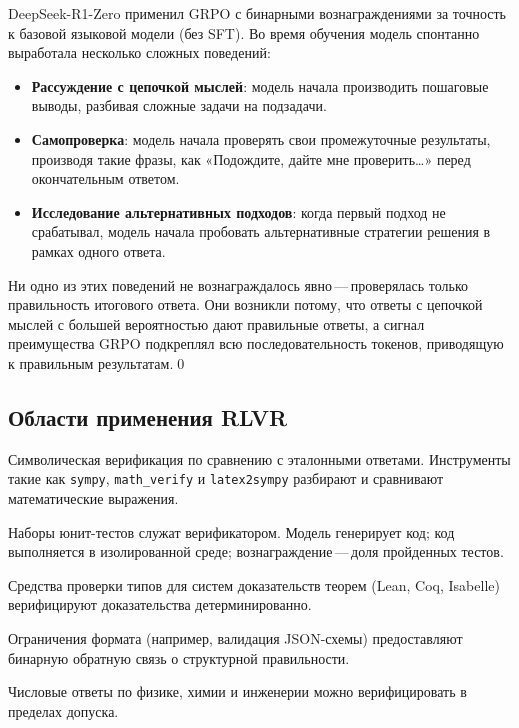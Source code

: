 \begin{example}
\label{ex:r1-zero}
DeepSeek-R1-Zero применил GRPO с бинарными вознаграждениями за точность к базовой языковой модели (без SFT). Во время обучения модель спонтанно выработала несколько сложных поведений:
\begin{itemize}[leftmargin=*]
  \item \textbf{Рассуждение с цепочкой мыслей}: модель начала производить пошаговые выводы, разбивая сложные задачи на подзадачи.
  \item \textbf{Самопроверка}: модель начала проверять свои промежуточные результаты, производя такие фразы, как «Подождите, дайте мне проверить\ldots» перед окончательным ответом.
  \item \textbf{Исследование альтернативных подходов}: когда первый подход не срабатывал, модель начала пробовать альтернативные стратегии решения в рамках одного ответа.
\end{itemize}
Ни одно из этих поведений не вознаграждалось явно\,---\,проверялась только правильность итогового ответа. Они возникли потому, что ответы с цепочкой мыслей с большей вероятностью дают правильные ответы, а сигнал преимущества GRPO подкреплял всю последовательность токенов, приводящую к правильным результатам.\qed
\end{example}

\subsection{Области применения RLVR}

\begin{description}[leftmargin=!,labelwidth=3.5cm]
  \item[Математика] Символическая верификация по сравнению с эталонными ответами. Инструменты такие как \texttt{sympy}, \texttt{math\_verify} и \texttt{latex2sympy} разбирают и сравнивают математические выражения.
  \item[Генерация кода] Наборы юнит-тестов служат верификатором. Модель генерирует код; код выполняется в изолированной среде; вознаграждение\,---\,доля пройденных тестов.
  \item[Формальные доказательства] Средства проверки типов для систем доказательств теорем (Lean, Coq, Isabelle) верифицируют доказательства детерминированно.
  \item[Генерация с ограничениями] Ограничения формата (например, валидация JSON-схемы) предоставляют бинарную обратную связь о структурной правильности.
  \item[Естественные науки] Числовые ответы по физике, химии и инженерии можно верифицировать в пределах допуска.
\end{description}

